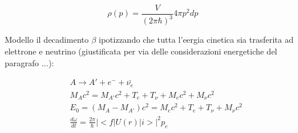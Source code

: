 \documentclass{article}
\begin{document}
\begin{equation}
    \rho(p)=\frac{V}{(2\pi\hbar)^3}4\pi p^2dp
\end{equation}


Modello il decadimento $\beta$ ipotizzando che tutta l'eergia cinetica sia trasferita ad elettrone e neutrino (giustificata per via delle considerazioni energetiche del paragrafo ...):

\begin{equation}
    \begin{aligned}
         & A\rightarrow A'+e^-+\bar{\nu_e}                        \\
         & M_Ac^2=M_{A'}c^2+T_e+T_{\nu}+M_ec^2+M_{\nu}c^2         \\
         & E_0=(M_A-M_{A'})c^2= M_ec^2+T_e+T_{\nu}+M_{\nu}c^2     \\
         & \frac{d\omega}{dt}=\frac{2\pi}{\hbar}|<f|U(r)|i>|^2p_e
    \end{aligned}
\end{equation}
\end{document}
